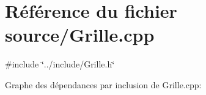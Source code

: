 \hypertarget{a00041}{
\section{Référence du fichier source/Grille.cpp}
\label{a00041}
}
{\ttfamily \#include \char`\"{}../include/Grille.h\char`\"{}}\par
Graphe des dépendances par inclusion de Grille.cpp:
